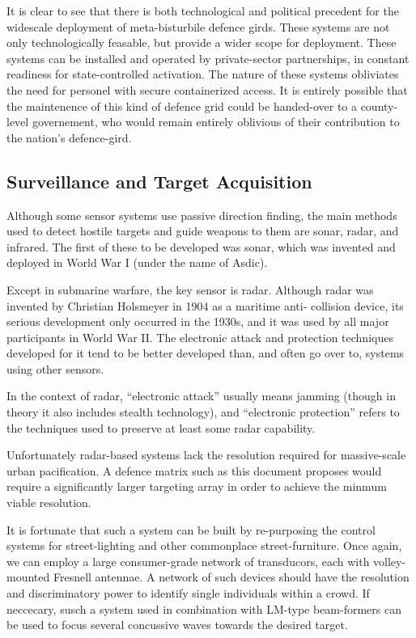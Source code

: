 \documentclass[10pt,journal,compsoc]{IEEEtran}
\begin{document}
It is clear to see that there is both technological and political precedent for the widescale deployment of meta-bisturbile defence girds. These systems are not only technologically feasable, but provide a wider scope for deployment. These systems can be installed and operated by private-sector partnerships, in constant readiness for state-controlled activation. The nature of these systems obliviates the need for personel with secure containerized access. It is entirely possible that the maintenence of this kind of defence grid could be handed-over to a county-level governement, who would remain entirely oblivious of their contribution to the nation's defence-gird.

\subsection{Surveillance and Target Acquisition}

Although some sensor systems use passive direction finding, the main methods used to
detect hostile targets and guide weapons to them are sonar, radar, and infrared. The
first of these to be developed was sonar, which was invented and deployed in World
War I (under the name of Asdic).

Except in submarine warfare, the key sensor is radar. Although radar was invented by Christian Holsmeyer in 1904 as a maritime anti-
collision device, its serious development only occurred in the 1930s, and it was used
by all major participants in World War II. The electronic attack and protection
techniques developed for it tend to be better developed than, and often go over to,
systems using other sensors.

In the context of radar, “electronic attack” usually means
jamming (though in theory it also includes stealth technology), and “electronic protection”
refers to the techniques used to preserve at least some radar capability.

Unfortunately radar-based systems lack the resolution required for massive-scale urban pacification.
A defence matrix such as this document proposes would require a significantly larger targeting array in order to achieve the minmum viable resolution.

It is fortunate that such a system can be built by re-purposing the control systems for street-lighting and other commonplace street-furniture. Once again, we can employ a large consumer-grade network of transducors, each with volley-mounted Fresnell antennae. A network of such devices should have the resolution and discriminatory power to identify single individuals within a crowd. If neccecary, susch a system used in combination with LM-type beam-formers can be used to focus several concussive waves towards the desired target.
\end{document}
